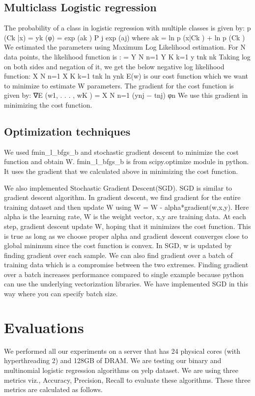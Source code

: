 \documentclass{article}
\begin{document}
\subsection{Multiclass Logistic regression}
The probability of a class in logistic regression with multiple classes is given by:
p (Ck |x) = yk (φ) = exp (ak ) P j exp (aj) where ak = ln p (x|Ck ) + ln p (Ck )
We estimated the parameters using Maximum Log Likelihood estimation. For N data points, the likelihood function is : 
= Y N n=1 Y K k=1 y tnk nk
Taking log on both sides and negation of it, we get the below negative log likelihood function:
X N n=1 X K k=1 tnk ln ynk
E(w) is our cost function which we want to minimize to estimate W parameters. The gradient for the cost function is given by:
∇E (w1, . . . , wK ) = X N n=1 (ynj − tnj) φn
We use this gradient in minimizing the cost function.

\subsection{Optimization techniques}
We used fmin\_l\_bfgs\_b and stochastic gradient descent to minimize the cost function and obtain W. fmin\_l\_bfgs\_b is from scipy.optimize module in python. It uses the gradient that we calculated above in minimizing the cost function.

We also implemented Stochastic Gradient Descent(SGD). SGD is similar to gradient descent algorithm. In gradient descent, we find gradient for the entire training dataset and then update W using W = W - alpha*gradient(w,x,y). Here alpha is the learning rate, W is the weight vector, x,y are training data. At each step, gradient descent update W, hoping that it minimizes the cost function. This is true as long as we choose proper alpha and gradient descent converges close to global minimum since the cost function is convex. In SGD, w is updated by finding gradient over each sample. We can also find gradient over a batch of training data which is a compromise between the two extremes. Finding gradient over a batch increases performance compared to single example because python can use the underlying vectorization libraries. We have implemented SGD in this way where you can specify batch size.

\section{Evaluations}

We performed all our experiments on a server that has 24 physical cores (with hyperthreading 2) and 128GB of DRAM. We are testing our binary and multinomial logistic regression algorithms on yelp dataset. We are using three metrics viz., Accuracy, Precision, Recall to evaluate these algorithms. These three metrics are calculated as follows.
\end{document}

